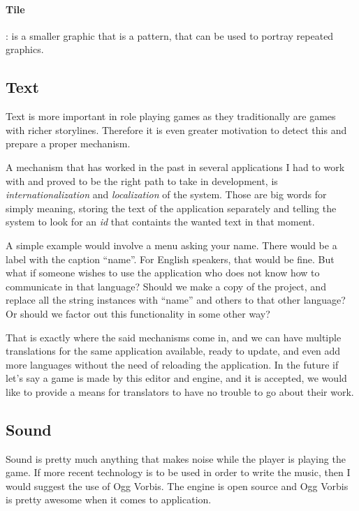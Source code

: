 \paragraph{Tile}: is a smaller graphic that is a pattern, that can be used to 
portray repeated graphics.

\subsection{Text}

Text is more important in role playing games as they traditionally are games
with richer storylines. Therefore it is even greater motivation to detect this
and prepare a proper mechanism.

A mechanism that has worked in the past in several applications I had to work
with and proved to be the right path to take in development, is
\textit{internationalization} and \textit{localization} of the system. Those 
are big words for simply meaning, storing the text of the application separately
and telling the system to look for an \textit{id} that containts the wanted 
text in that moment. 

A simple example would involve a menu asking your name. There would be a label
with the caption ``name''. For English speakers, that would be fine. But what
if someone wishes to use the application who does not know how to communicate
in that language? Should we make a copy of the project, and replace all the 
string instances with ``name'' and others to that other language? Or should we
factor out this functionality in some other way?

That is exactly where the said mechanisms come in, and we can have multiple
translations for the same application available, ready to update, and even add
more languages without the need of reloading the application. In the future if
let's say a game is made by this editor and engine, and it is accepted, we
would like to provide a means for translators to have no trouble to go about
their work.

\subsection{Sound}

Sound is pretty much anything that makes noise while the player is playing the
game. If more recent technology is to be used in order to write the music, then
I would suggest the use of Ogg Vorbis. The engine is open source and Ogg Vorbis
is pretty awesome when it comes to application.

